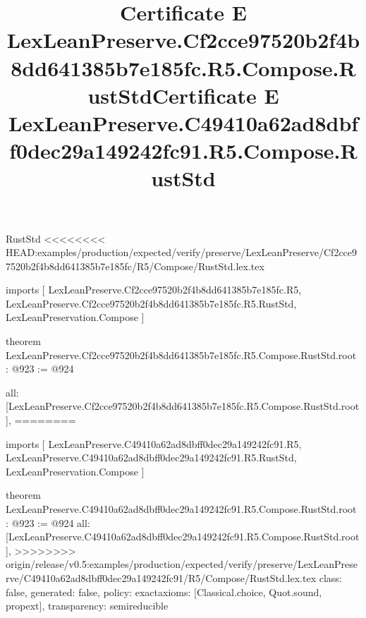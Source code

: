 \begin{lexlean}{RustStd}
<<<<<<<< HEAD:examples/production/expected/verify/preserve/LexLeanPreserve/Cf2cce97520b2f4b8dd641385b7e185fc/R5/Compose/RustStd.lex.tex
\title{Certificate E LexLeanPreserve.Cf2cce97520b2f4b8dd641385b7e185fc.R5.Compose.RustStd}
\begin{coremodule}
imports [
  LexLeanPreserve.Cf2cce97520b2f4b8dd641385b7e185fc.R5,
  LexLeanPreserve.Cf2cce97520b2f4b8dd641385b7e185fc.R5.RustStd,
  LexLeanPreservation.Compose
]

theorem LexLeanPreserve.Cf2cce97520b2f4b8dd641385b7e185fc.R5.Compose.RustStd.root : @923 := @924 {
  all: [LexLeanPreserve.Cf2cce97520b2f4b8dd641385b7e185fc.R5.Compose.RustStd.root],
========
\title{Certificate E LexLeanPreserve.C49410a62ad8dbff0dec29a149242fc91.R5.Compose.RustStd}
\begin{coremodule}
imports [
  LexLeanPreserve.C49410a62ad8dbff0dec29a149242fc91.R5,
  LexLeanPreserve.C49410a62ad8dbff0dec29a149242fc91.R5.RustStd,
  LexLeanPreservation.Compose
]

theorem LexLeanPreserve.C49410a62ad8dbff0dec29a149242fc91.R5.Compose.RustStd.root : @923 := @924 {
  all: [LexLeanPreserve.C49410a62ad8dbff0dec29a149242fc91.R5.Compose.RustStd.root],
>>>>>>>> origin/release/v0.5:examples/production/expected/verify/preserve/LexLeanPreserve/C49410a62ad8dbff0dec29a149242fc91/R5/Compose/RustStd.lex.tex
  class: false,
  generated: false,
  policy: exact{axioms: [Classical.choice, Quot.sound, propext]},
  transparency: semireducible
}


\end{coremodule}}
\end{coremodule}
\end{lexlean}
